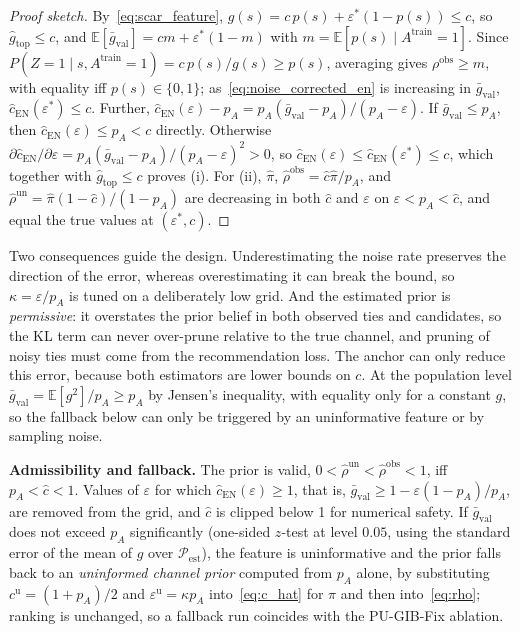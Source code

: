 \documentclass[sigconf]{acmart}
\begin{document}
\begin{proof}[Proof sketch]
By~\eqref{eq:scar_feature}, $g(s) = c\,p(s) + \varepsilon^\ast(1-p(s)) \le c$, so $\hat{g}_{\text{top}} \le c$, and $\mathbb{E}[\bar{g}_{\text{val}}] = cm + \varepsilon^\ast(1-m)$ with $m = \mathbb{E}[p(s) \mid A^{\text{train}}=1]$. Since $P(Z=1 \mid s, A^{\text{train}}=1) = c\,p(s)/g(s) \ge p(s)$, averaging gives $\rho^{\text{obs}} \ge m$, with equality iff $p(s) \in \{0,1\}$; as~\eqref{eq:noise_corrected_en} is increasing in $\bar{g}_{\text{val}}$, $\hat{c}_{\text{EN}}(\varepsilon^\ast) \le c$. Further, $\hat{c}_{\text{EN}}(\varepsilon) - p_A = p_A(\bar{g}_{\text{val}} - p_A)/(p_A - \varepsilon)$. If $\bar{g}_{\text{val}} \le p_A$, then $\hat{c}_{\text{EN}}(\varepsilon) \le p_A < c$ directly. Otherwise $\partial \hat{c}_{\text{EN}}/\partial \varepsilon = p_A(\bar{g}_{\text{val}} - p_A)/(p_A-\varepsilon)^2 > 0$, so $\hat{c}_{\text{EN}}(\varepsilon) \le \hat{c}_{\text{EN}}(\varepsilon^\ast) \le c$, which together with $\hat{g}_{\text{top}} \le c$ proves (i). For (ii), $\hat{\pi}$, $\hat{\rho}^{\text{obs}} = \hat{c}\hat{\pi}/p_A$, and $\hat{\rho}^{\text{un}} = \hat{\pi}(1-\hat{c})/(1-p_A)$ are decreasing in both $\hat{c}$ and $\varepsilon$ on $\varepsilon < p_A < \hat{c}$, and equal the true values at $(\varepsilon^\ast, c)$.
\end{proof}

Two consequences guide the design. Underestimating the noise rate preserves the direction of the error, whereas overestimating it can break the bound, so $\kappa = \varepsilon/p_A$ is tuned on a deliberately low grid. And the estimated prior is \emph{permissive}: it overstates the prior belief in both observed ties and candidates, so the KL term can never over-prune relative to the true channel, and pruning of noisy ties must come from the recommendation loss. The anchor can only reduce this error, because both estimators are lower bounds on $c$. At the population level $\bar{g}_{\text{val}} = \mathbb{E}[g^2]/p_A \ge p_A$ by Jensen's inequality, with equality only for a constant $g$, so the fallback below can only be triggered by an uninformative feature or by sampling noise.

\textbf{Admissibility and fallback.} The prior is valid, $0 < \hat{\rho}^{\text{un}} < \hat{\rho}^{\text{obs}} < 1$, iff $p_A < \hat{c} < 1$. Values of $\varepsilon$ for which $\hat{c}_{\text{EN}}(\varepsilon) \ge 1$, that is, $\bar{g}_{\text{val}} \ge 1 - \varepsilon(1-p_A)/p_A$, are removed from the grid, and $\hat{c}$ is clipped below 1 for numerical safety. If $\bar{g}_{\text{val}}$ does not exceed $p_A$ significantly (one-sided $z$-test at level $0.05$, using the standard error of the mean of $g$ over $\mathcal{P}_{\text{est}}$), the feature is uninformative and the prior falls back to an \emph{uninformed channel prior} computed from $p_A$ alone, by substituting $c^{\text{u}} = (1+p_A)/2$ and $\varepsilon^{\text{u}} = \kappa p_A$ into~\eqref{eq:c_hat} for $\pi$ and then into~\eqref{eq:rho}; ranking is unchanged, so a fallback run coincides with the PU-GIB-Fix ablation.
\end{document}
